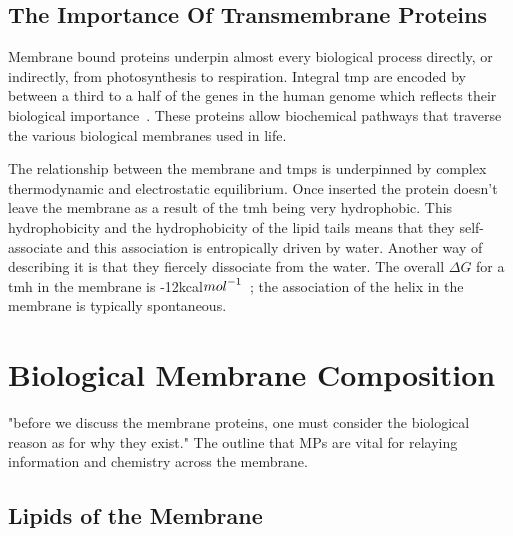 

\subsection{The Importance Of Transmembrane Proteins}
Membrane bound proteins underpin almost every biological process directly, or indirectly, from photosynthesis to respiration.
Integral \gls{tmp} are encoded by between a third to a half of the genes in the human genome which reflects their biological importance~\cite{Hopkins2002, Almen2009, Wang2013}.
These proteins allow biochemical pathways that traverse the various biological membranes used in life.

The relationship between the membrane and \gls{tmp}s is underpinned by complex thermodynamic and electrostatic equilibrium.
Once inserted the protein doesn't leave the membrane as a result of the \gls{tmh} being very hydrophobic.
This hydrophobicity and the hydrophobicity of the lipid tails means that they self-associate and this association is entropically driven by water.
Another way of describing it is that they fiercely dissociate from the water.
The overall $\Delta G$ for a \gls{tmh} in the membrane is -12kcal${mol}^{\--1}$~\cite{Cymer2015}; the association of the helix in the membrane is typically spontaneous.

\section{Biological Membrane Composition}

"before we discuss the membrane proteins, one must consider the biological reason as for why they exist."
The outline that MPs are vital for relaying information and chemistry across the membrane.
\subsection{Lipids of the Membrane}

